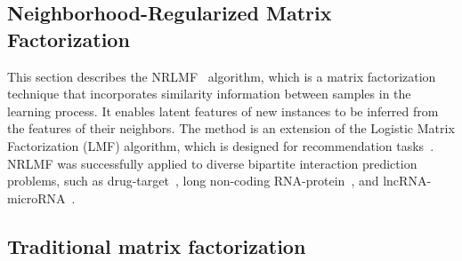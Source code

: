 \begin{apendicesenv}



\section{Neighborhood-Regularized Matrix Factorization}
\label{sec:nrlmf}

This section describes the NRLMF~\cite{liu2016neighborhood} algorithm, which is a matrix factorization technique that incorporates similarity information between samples in the learning process. It enables latent features of new instances to be inferred from the features of their neighbors.
The method is an extension of the Logistic Matrix Factorization (LMF) algorithm, which is designed for recommendation tasks~\cite{johnsonlogistic}.
NRLMF was successfully applied to diverse bipartite interaction prediction problems, such as drug-target~\cite{liu2016neighborhood}, long non-coding RNA-protein~\cite{liu2017lpinrlmf}, and lncRNA-microRNA~\cite{liu2020predicting}.


\subsection{Traditional matrix factorization}
\label{sec:traditional matrix factorization}




\end{apendicesenv}
